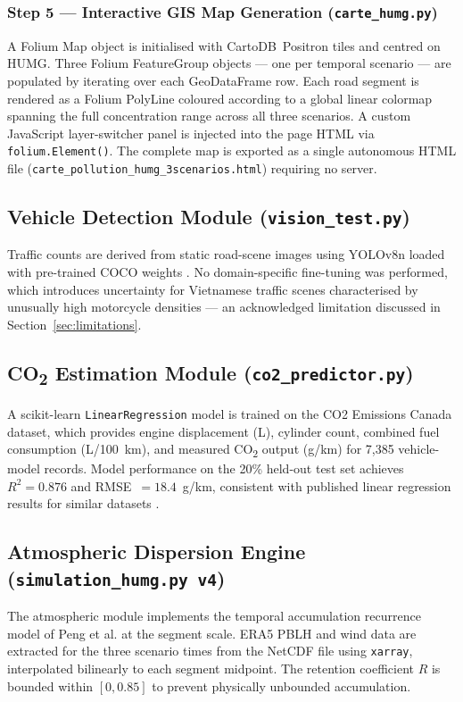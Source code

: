 \documentclass[12pt,a4paper]{article}
\begin{document}
\subsubsection{Step 5 --- Interactive GIS Map Generation (\texttt{carte\_humg.py})}
A Folium Map object is initialised with CartoDB~Positron tiles and centred on HUMG. Three Folium FeatureGroup objects --- one per temporal scenario --- are populated by iterating over each GeoDataFrame row. Each road segment is rendered as a Folium PolyLine coloured according to a global linear colormap spanning the full concentration range across all three scenarios. A custom JavaScript layer-switcher panel is injected into the page HTML via \texttt{folium.Element()}. The complete map is exported as a single autonomous HTML file (\texttt{carte\_pollution\_humg\_3scenarios.html}) requiring no server.

\subsection{Vehicle Detection Module (\texttt{vision\_test.py})}
Traffic counts are derived from static road-scene images using YOLOv8n loaded with pre-trained COCO weights \cite{Ultralytics2023}. No domain-specific fine-tuning was performed, which introduces uncertainty for Vietnamese traffic scenes characterised by unusually high motorcycle densities --- an acknowledged limitation discussed in Section~\ref{sec:limitations}.

\subsection{CO\textsubscript{2} Estimation Module (\texttt{co2\_predictor.py})}
A scikit-learn \texttt{LinearRegression} model is trained on the CO2 Emissions Canada dataset, which provides engine displacement (L), cylinder count, combined fuel consumption (L/100~km), and measured CO\textsubscript{2} output (g/km) for 7,385 vehicle-model records. Model performance on the 20\% held-out test set achieves $R^2 = 0.876$ and RMSE~$= 18.4$~g/km, consistent with published linear regression results for similar datasets \cite{Mokhtarzadeh2021}.

\subsection{Atmospheric Dispersion Engine (\texttt{simulation\_humg.py~v4})}
The atmospheric module implements the temporal accumulation recurrence model of Peng et al. \cite{Peng2023} at the segment scale. ERA5 PBLH and wind data are extracted for the three scenario times from the NetCDF file using \texttt{xarray}, interpolated bilinearly to each segment midpoint. The retention coefficient $R$ is bounded within $[0, 0.85]$ to prevent physically unbounded accumulation.
\end{document}
